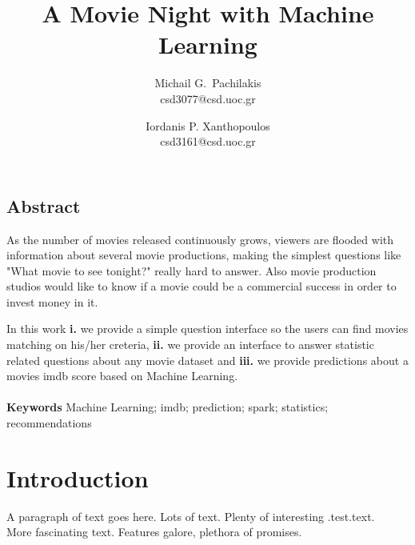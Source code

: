 \documentclass[letterpaper,twocolumn,10pt]{article}
\begin{document}
\date{}

\title{\Large \bf A Movie Night with Machine Learning}

\author{
{\rm Michail G.\ Pachilakis}\\
csd3077@csd.uoc.gr
\and
{\rm Iordanis P. Xanthopoulos}\\
csd3161@csd.uoc.gr
} %

\maketitle

\thispagestyle{empty}


\subsection*{Abstract}
As the number of movies released continuously grows, viewers are flooded with information about several movie productions, making the simplest questions like "What movie to see tonight?" really hard to answer. Also movie production studios would like to know if a movie could be a commercial success in order to invest money in it.\par In this work \textbf{i.} we provide a simple question interface so the users can find movies matching on his/her creteria, \textbf{ii.} we provide an interface to answer statistic related questions about any movie dataset and \textbf{iii.} we provide predictions about a movies imdb score based on Machine Learning.\\
\\
\textbf{Keywords} Machine Learning; imdb; prediction; spark; statistics; recommendations


\section{Introduction}

A paragraph of text goes here.  Lots of text.  Plenty of interesting
.test.text. \\ 

More fascinating text. Features galore, plethora of promises.\\
\end{document}
